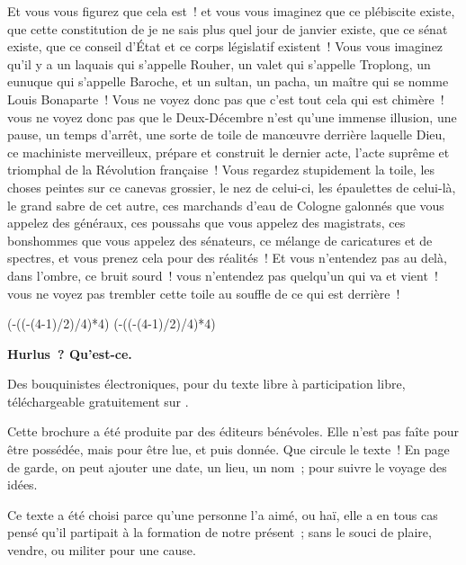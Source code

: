 \documentclass[french,twoside]{book} %
\def\truncdiv#1#2{((#1-(#2-1)/2)/#2)}
\def\moduloop#1#2{(#1-\truncdiv{#1}{#2}*#2)}
\def\modulo#1#2{\number\numexpr\moduloop{#1}{#2}\relax}
\begin{document}
Et vous vous figurez que cela est ! et vous vous imaginez que ce plébiscite existe, que cette constitution de je ne sais plus quel jour de janvier existe, que ce sénat existe, que ce conseil d’État et ce corps législatif existent ! Vous vous imaginez qu’il y a un laquais qui s’appelle Rouher, un valet qui s’appelle Troplong, un eunuque qui s’appelle Baroche, et un sultan, un pacha, un maître qui se nomme Louis Bonaparte ! Vous ne voyez donc pas que c’est tout cela qui est chimère ! vous ne voyez donc pas que le Deux-Décembre n’est qu’une immense illusion, une pause, un temps d’arrêt, une sorte de toile de manœuvre derrière laquelle Dieu, ce machiniste merveilleux, prépare et construit le dernier acte, l’acte suprême et triomphal de la Révolution française ! Vous regardez stupidement la toile, les choses peintes sur ce canevas grossier, le nez de celui-ci, les épaulettes de celui-là, le grand sabre de cet autre, ces marchands d’eau de Cologne galonnés que vous appelez des généraux, ces poussahs que vous appelez des magistrats, ces bonshommes que vous appelez des sénateurs, ce mélange de caricatures et de spectres, et vous prenez cela pour des réalités ! Et vous n’entendez pas au delà, dans l’ombre, ce bruit sourd ! vous n’entendez pas quelqu’un qui va et vient ! vous ne voyez pas trembler cette toile au souffle de ce qui est derrière !
 


\ifbooklet
  \pagestyle{empty}
  \clearpage
  \ifnum\modulo{\value{page}}{4}=0 \hbox{}\newpage\hbox{}\newpage\fi
  \ifnum\modulo{\value{page}}{4}=1 \hbox{}\newpage\hbox{}\newpage\fi


  \hbox{}\newpage
  \ifodd\value{page}\hbox{}\newpage\fi
  {\centering\color{rubric}\bfseries\noindent\large
    Hurlus ? Qu’est-ce.\par
    \bigskip
  }
  \noindent Des bouquinistes électroniques, pour du texte libre à participation libre,
  téléchargeable gratuitement sur \href{https://hurlus.fr}{}.\par
  \bigskip
  \noindent Cette brochure a été produite par des éditeurs bénévoles.
  Elle n’est pas faîte pour être possédée, mais pour être lue, et puis donnée.
  Que circule le texte !
  En page de garde, on peut ajouter une date, un lieu, un nom ; pour suivre le voyage des idées.
  \par

  Ce texte a été choisi parce qu’une personne l’a aimé,
  ou haï, elle a en tous cas pensé qu’il partipait à la formation de notre présent ;
  sans le souci de plaire, vendre, ou militer pour une cause.
  \par
\end{document}
